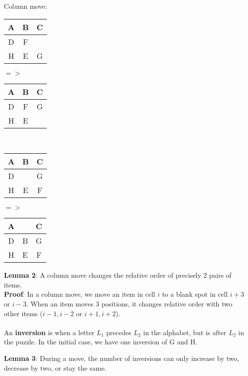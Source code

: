 \documentclass{article}
\begin{document}
	\begin{center}
		Column move:\\
		$ $\\
		\begin{tabular}{ |c|c|c| } 
			\hline
			A & B & C \\
			\hline
			D & F & \\ 
			\hline
			H & E & G\\ 
			\hline
		\end{tabular} $=>$
		\begin{tabular}{ |c|c|c| } 
			\hline
			A & B & C \\
			\hline
			D & F  & G \\ 
			\hline
			H & E & \\ 
			\hline
		\end{tabular}
		\\
		$ $\\
		$ $\\
		\begin{tabular}{ |c|c|c| } 
			\hline
			A & B & C \\
			\hline
			D &  & G \\ 
			\hline
			H & E & F\\ 
			\hline
		\end{tabular} $=>$
		\begin{tabular}{ |c|c|c| } 
			\hline
			A &  & C \\
			\hline
			D & B  & G \\ 
			\hline
			H & E & F\\ 
			\hline
		\end{tabular}
	\end{center}
	\textbf{Lemma 2}: A column move changes the relative order of precisely 2 pairs of items.\\
	\textbf{Proof}: In a column move, we move an item in cell $i$ to a blank spot in cell $i + 3$ or $i - 3$. When an item moves 3 positions, it changes relative order with two other items ($i - 1, i - 2$ or $i + 1, i + 2$). \qedsymbol
	\\
	\\
	An \textbf{inversion} is when a letter $L_1$ precedes $L_2$ in the alphabet, but is after $L_2$ in the puzzle. In the initial case, we have one inversion of G and H.
	
	\pagebreak
	
	\textbf{Lemma 3}: During a move, the number of inversions can only increase by two, decrease by two, or stay the same.
	
\end{document}
